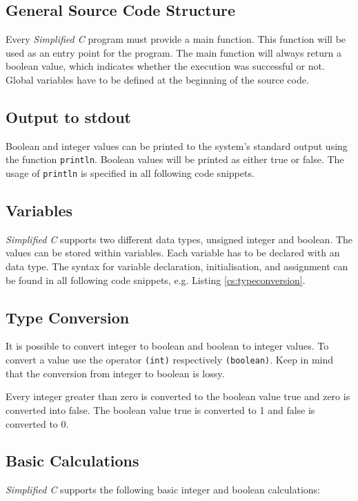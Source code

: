 \documentclass[12pt,a4paper,titlepage,oneside,final]{article}
\begin{document}
\subsection{General Source Code Structure}
\label{subsec:sourcecodestructure}
Every \emph{Simplified C} program must provide a main function. This function will be used as an entry point for the program. The main function will always return a boolean value, which indicates whether the execution was successful or not. Global variables have to be defined at the beginning of the source code.

\subsection{Output to stdout}
Boolean and integer values can be printed to the system's standard output using the function \texttt{println}. Boolean values will be printed as either true or false. The usage of \texttt{println} is specified in all following code snippets.

\subsection{Variables}
\emph{Simplified C} supports two different data types, unsigned integer and boolean. The values can be stored within variables. Each variable has to be declared with an data type. The syntax for variable declaration, initialisation, and assignment can be found in all following code snippets, e.g. Listing \vref{cs:typeconversion}.

\subsection{Type Conversion}
It is possible to convert integer to boolean and boolean to integer values. To convert a value use the operator \texttt{(int)} respectively \texttt{(boolean)}. Keep in mind that the conversion from integer to boolean is lossy. 

Every integer greater than zero is converted to the boolean value true and zero is converted into false. The boolean value true is converted to 1 and false is converted to 0.


\subsection{Basic Calculations}
\emph{Simplified C} supports the following basic integer and boolean calculations:
\end{document}
